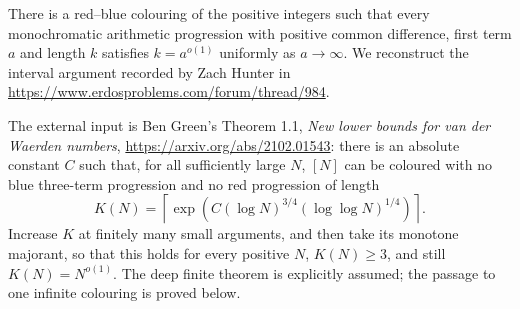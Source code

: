 There is a red--blue colouring of the positive integers such that every monochromatic arithmetic progression with positive common difference, first term $a$ and length $k$ satisfies $k=a^{o(1)}$ uniformly as $a\to\infty$. We reconstruct the interval argument recorded by Zach Hunter in \url{https://www.erdosproblems.com/forum/thread/984}.

The external input is Ben Green's Theorem 1.1, \emph{New lower bounds for van der Waerden numbers}, \url{https://arxiv.org/abs/2102.01543}: there is an absolute constant $C$ such that, for all sufficiently large $N$, $[N]$ can be coloured with no blue three-term progression and no red progression of length
\[
 K(N)=\left\lceil\exp\!\left(C(\log N)^{3/4}(\log\log N)^{1/4}\right)\right\rceil.
\]
Increase $K$ at finitely many small arguments, and then take its monotone majorant, so that this holds for every positive $N$, $K(N)\ge3$, and still $K(N)=N^{o(1)}$. The deep finite theorem is explicitly assumed; the passage to one infinite colouring is proved below.
